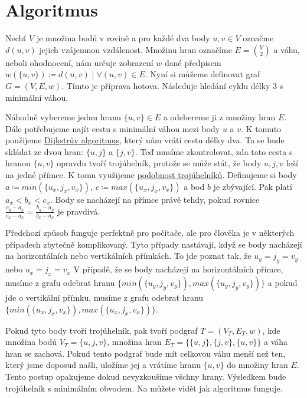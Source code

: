 \section{Algoritmus}
\label{sec:algoritmus}

Nechť $V$ je množina bodů v rovině a pro každé dva body $u, v \in V$ označme $d(u, v)$ jejich vzájemnou vzdálenost. Množinu hran označíme $E = \binom{V}{2}$ a váhu, neboli ohodnocení, nám určuje zobrazení $w$ dané předpisem $w(\{u, v\}) \coloneqq d(u, v)\mid \forall (u, v) \in E$. Nyní si můžeme definovat graf $G = (V, E, w)$.
Tímto je příprava hotova. Následuje hledání cyklu délky 3 s minimální váhou.

Náhodně vybereme jednu hranu $\{u, v\} \in E$ a odebereme ji z množiny hran $E$. Dále potřebujeme najít cestu s minimální váhou mezi body $u$ a  $v$. K tomuto použijeme \hyperref[sec:dijkstra]{Dijkstrův algoritmus}, který nám vrátí cestu délky dva. Ta se bude skládat ze dvou hran: $\{u, j\}$ a $\{j, v\}$. Teď musíme zkontrolovat, zda tato cesta s hranou $\{u, v\}$ opravdu tvoří trojúhelník, protože se může  stát, že body $u, j, v$ leží na jedné přímce. K tomu využijeme \hyperref[definice:podobnost_trojuhelniku]{podobnost trojúhelníků}. Definujeme si body $a \coloneqq min(\{u_x, j_x, v_x\})$, $c \coloneqq max(\{u_x, j_x, v_x\})$ a bod $b$ je zbývající. Pak platí $a_x < b_x < c_x$. Body se nacházejí na přímce právě tehdy, pokud rovnice $\frac{c_y - a_y}{c_x - a_x} = \frac{b_y - a_y}{b_x - a_x}$ je pravdivá.
\begin{poznamka}
Předchozí způsob funguje perfektně pro počítače, ale pro člověka je v některých případech zbytečně komplikovaný. Tyto případy nastávají, když se body nacházejí na horizontálních nebo vertikálních přímkách. To jde poznat tak, že $u_y = j_y = v_y$ nebo $u_x = j_x = v_x$
V případě, že se body nacházejí na horizontálních přímce, musíme z grafu odebrat hranu $\{min(\{u_y, j_y, v_y\}), max(\{u_y, j_y, v_y\})\}$ a pokud jde o vertikální přímku, musíme z grafu odebrat hranu $\{min(\{u_x, j_x, v_x\}), max(\{u_x, j_x, v_x\})\}$.
\end{poznamka}


Pokud tyto body tvoří trojúhelník, pak tvoří podgraf $T = (V_T, E_T, w)$, kde množina bodů $V_T = \{u, j, v\}$, množina hran $E_T = \{\{u,j\}, \{j,v\}, \{u,v\}\}$ a váha hran se zachová. Pokud tento podgraf bude mít celkovou váhu menší než ten, který jsme doposud našli, uložíme jej a vrátíme hranu $\{u, v\}$ do množiny hran $E$. Tento postup opakujeme dokud nevyzkoušíme všchny hrany. Výsledkem bude trojúhelník s minimálním obvodem. Na  můžete vidět jak algoritmus funguje.

